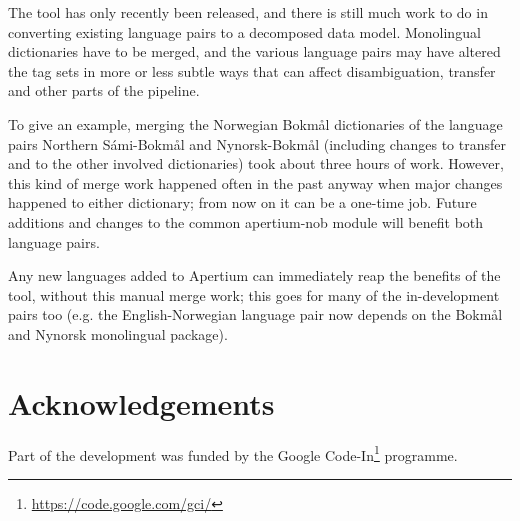 \documentclass[10pt, a4paper]{article}
\begin{document}
The tool has only recently been released, and there is still much work
to do in converting existing language pairs to a decomposed data
model. Monolingual dictionaries have to be merged, and the various
language pairs may have altered the tag sets in more or less subtle
ways that can affect disambiguation, transfer and other parts of the
pipeline. 

To give an example, merging the Norwegian Bokmål dictionaries of the
language pairs Northern Sámi-Bokmål and Nynorsk-Bokmål (including
changes to transfer and to the other involved dictionaries) took about
three hours of work. However, this kind of merge work happened often
in the past anyway when major changes happened to either dictionary;
from now on it can be a one-time job. Future additions and changes to
the common apertium-nob module will benefit both language pairs.

Any new languages added to Apertium can immediately reap the benefits
of the tool, without this manual merge work; this goes for many of the
in-development pairs too (e.g. the English-Norwegian language pair now
depends on the Bokmål and Nynorsk monolingual package).


\section*{Acknowledgements}
Part of the development was funded by the Google
Code-In\footnote{\href{https://code.google.com/gci/}{https://code.google.com/gci/}} programme.



\end{document}
